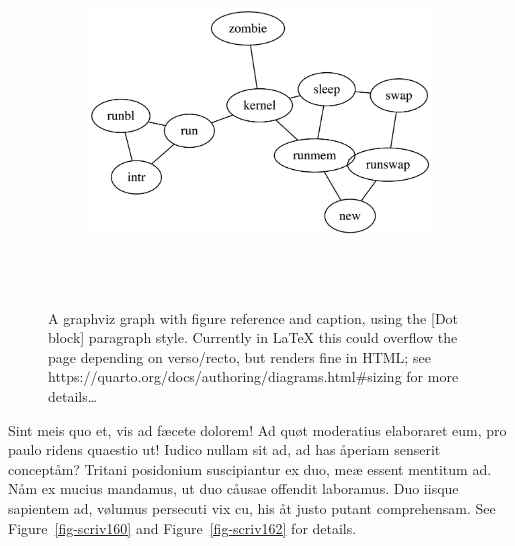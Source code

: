\documentclass[
  12pt,
  a4paper,
  oneside,
  titlepage,
  toclink=all,
  toc=bibliography]{scrbook}
\theoremstyle{plain}
\theoremstyle{plain}
\theoremstyle{definition}
\theoremstyle{definition}
\theoremstyle{plain}
\theoremstyle{plain}
\theoremstyle{plain}
\theoremstyle{definition}
\theoremstyle{remark}
\begin{document}
\begin{figure}

{\centering 

\begin{figure}[H]

{\centering \includegraphics[width=5.5in,height=3.5in]{export_files/figure-latex/dot-figure-1.png}

}

\end{figure}

}

\caption{\label{fig-scriv159}A graphviz graph with figure reference and
caption, using the {[}Dot block{]} paragraph style. Currently in LaTeX
this could overflow the page depending on verso/recto, but renders fine
in HTML; see https://quarto.org/docs/authoring/diagrams.html\#sizing for
more details\ldots{}}

\end{figure}

Sint meis quo et, vis ad fæcete dolorem! Ad quøt moderatius elaboraret
eum, pro paulo ridens quaestio ut! Iudico nullam sit ad, ad has åperiam
senserit conceptåm? Tritani posidonium suscipiantur ex duo, meæ essent
mentitum ad. Nåm ex mucius mandamus, ut duo cåusae offendit laboramus.
Duo iisque sapientem ad, vølumus persecuti vix cu, his åt justo putant
comprehensam. See
\protect\hypertarget{cite_20}{}{\label{cite_20}Figure~\ref{fig-scriv160}}
and
\protect\hypertarget{cite_21}{}{\label{cite_21}Figure~\ref{fig-scriv162}}
for details.
\end{document}
